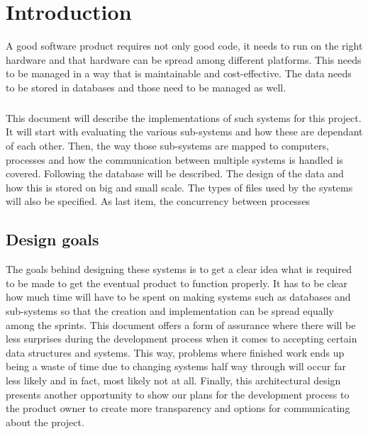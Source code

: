 \chapter{Introduction}
A good software product requires not only good code, it needs to run on the right hardware and that hardware can be spread among different platforms. This needs to be managed in a way that is maintainable and cost-effective. The data needs to be stored in databases and those need to be managed as well.
\paragraph{}
This document will describe the implementations of such systems for this project. It will start with evaluating the various sub-systems and how these are dependant of each other. Then, the way those sub-systems are mapped to computers, processes and how the communication between multiple systems is handled is covered. 
Following the database will be described. The design of the data and how this is stored on big and small scale. The types of files used by the systems will also be specified. 
As last item, the concurrency between processes 
\section{Design goals}
The goals behind designing these systems is to get a clear idea what is required to be made to get the eventual product to function properly. It has to be clear how much time will have to be spent on making systems such as databases and sub-systems so that the creation and implementation can be spread equally among the sprints. This document offers a form of assurance where there will be less surprises during the development process when it comes to accepting certain data structures and systems. This way, problems where finished work ends up being a waste of time due to changing systems half way through will occur far less likely and in fact, most likely not at all.
Finally, this architectural design presents another opportunity to show our plans for the development process to the product owner to create more transparency and options for communicating about the project.

